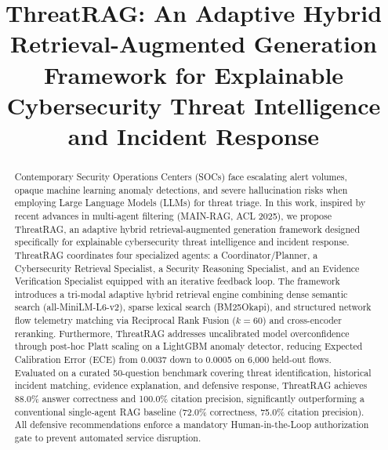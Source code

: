 \documentclass[conference]{IEEEtran}
\begin{document}
\title{ThreatRAG: An Adaptive Hybrid Retrieval-Augmented Generation Framework for Explainable Cybersecurity Threat Intelligence and Incident Response}

\author{
}

\maketitle

\begin{abstract}
Contemporary Security Operations Centers (SOCs) face escalating alert volumes, opaque machine learning anomaly detections, and severe hallucination risks when employing Large Language Models (LLMs) for threat triage. In this work, inspired by recent advances in multi-agent filtering (MAIN-RAG, ACL 2025), we propose ThreatRAG, an adaptive hybrid retrieval-augmented generation framework designed specifically for explainable cybersecurity threat intelligence and incident response. ThreatRAG coordinates four specialized agents: a Coordinator/Planner, a Cybersecurity Retrieval Specialist, a Security Reasoning Specialist, and an Evidence Verification Specialist equipped with an iterative feedback loop. The framework introduces a tri-modal adaptive hybrid retrieval engine combining dense semantic search (all-MiniLM-L6-v2), sparse lexical search (BM25Okapi), and structured network flow telemetry matching via Reciprocal Rank Fusion ($k=60$) and cross-encoder reranking. Furthermore, ThreatRAG addresses uncalibrated model overconfidence through post-hoc Platt scaling on a LightGBM anomaly detector, reducing Expected Calibration Error (ECE) from 0.0037 down to 0.0005 on 6,000 held-out flows. Evaluated on a curated 50-question benchmark covering threat identification, historical incident matching, evidence explanation, and defensive response, ThreatRAG achieves 88.0\% answer correctness and 100.0\% citation precision, significantly outperforming a conventional single-agent RAG baseline (72.0\% correctness, 75.0\% citation precision). All defensive recommendations enforce a mandatory Human-in-the-Loop authorization gate to prevent automated service disruption.
\end{abstract}
\end{document}
